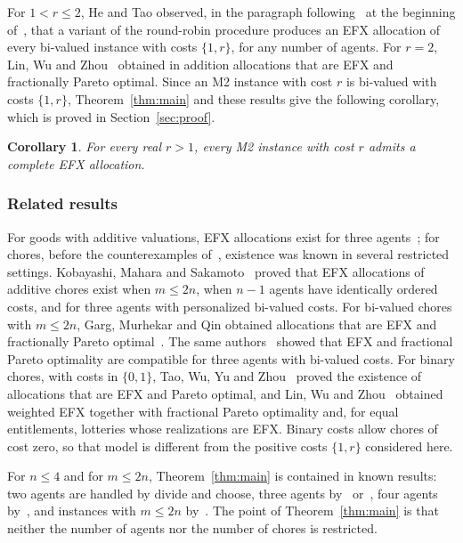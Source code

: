 \documentclass{amsart}
\numberwithin{equation}{section}
\newtheorem{corollary}[theorem]{Corollary}
\theoremstyle{definition}
\theoremstyle{remark}
\begin{document}
For $1<r\le 2$, He and Tao observed, in the paragraph following~\cite[Theorem~3]{HT26} at the beginning of~\cite[Section~5]{HT26}, that a variant of the round-robin procedure produces an EFX allocation of every bi-valued instance with costs $\{1,r\}$, for any number of agents. For $r=2$, Lin, Wu and Zhou~\cite[Theorem~4.1]{LWZ25} obtained in addition allocations that are EFX and fractionally Pareto optimal. Since an M2 instance with cost $r$ is bi-valued with costs $\{1,r\}$, Theorem~\ref{thm:main} and these results give the following corollary, which is proved in Section~\ref{sec:proof}.

\begin{corollary}\label{cor:allr}
For every real $r>1$, every M2 instance with cost $r$ admits a complete EFX allocation.
\end{corollary}

\subsubsection*{Related results}
For goods with additive valuations, EFX allocations exist for three agents~\cite{CGM24}; for chores, before the counterexamples of~\cite{HT26}, existence was known in several restricted settings. Kobayashi, Mahara and Sakamoto~\cite{KMS23} proved that EFX allocations of additive chores exist when $m\le 2n$, when $n-1$ agents have identically ordered costs, and for three agents with personalized bi-valued costs. For bi-valued chores with $m\le 2n$, Garg, Murhekar and Qin obtained allocations that are EFX and fractionally Pareto optimal~\cite[arXiv version, Theorem~14]{GMQ25}. The same authors~\cite{GMQ23} showed that EFX and fractional Pareto optimality are compatible for three agents with bi-valued costs. For binary chores, with costs in $\{0,1\}$, Tao, Wu, Yu and Zhou~\cite{TWYZ25} proved the existence of allocations that are EFX and Pareto optimal, and Lin, Wu and Zhou~\cite{LWZ26} obtained weighted EFX together with fractional Pareto optimality and, for equal entitlements, lotteries whose realizations are EFX. Binary costs allow chores of cost zero, so that model is different from the positive costs $\{1,r\}$ considered here.

For $n\le 4$ and for $m\le 2n$, Theorem~\ref{thm:main} is contained in known results: two agents are handled by divide and choose, three agents by~\cite{GMQ23} or~\cite{KMS23}, four agents by~\cite[Theorem~3]{HT26}, and instances with $m\le 2n$ by~\cite{KMS23}. The point of Theorem~\ref{thm:main} is that neither the number of agents nor the number of chores is restricted.
\end{document}
